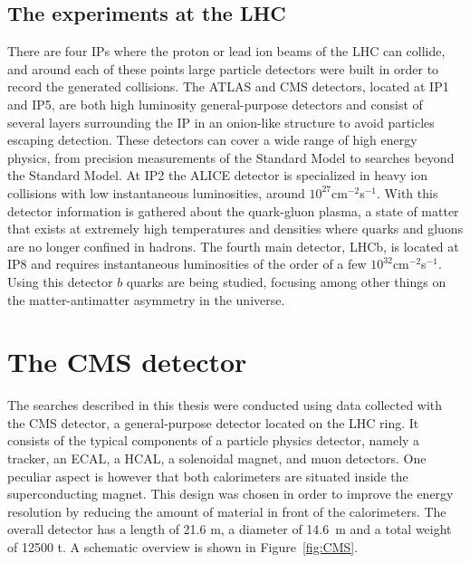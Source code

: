 \subsection{The experiments at the LHC}

There are four \acp{IP} where the proton or lead ion beams of the \ac{LHC} can collide, and around each of these points large particle detectors were built in order to record the generated collisions. The \acs{ATLAS} and \ac{CMS} detectors, located at \ac{IP}1 and \ac{IP}5, are both high luminosity general-purpose detectors and consist of several layers surrounding the \ac{IP} in an onion-like structure to avoid particles escaping detection. These detectors can cover a wide range of high energy physics, from precision measurements of the Standard Model to searches beyond the Standard Model. At \ac{IP}2 the \acs{ALICE} detector is specialized in heavy ion collisions with low instantaneous luminosities, around $10^{27}$cm$^{-2}$s$^{-1}$. With this detector information is gathered about the quark-gluon plasma, a state of matter that exists at extremely high temperatures and densities where quarks and gluons are no longer confined in hadrons. The fourth main detector, \acs{LHCb}, is located at \ac{IP}8 and requires instantaneous luminosities of the order of a few $10^{32}$cm$^{-2}$s$^{-1}$. Using this detector $b$ quarks are being studied, focusing among other things on the matter-antimatter asymmetry in the universe.

\section{The CMS detector} 
\label{sec:CMS}

The searches described in this thesis were conducted using data collected with the \ac{CMS} detector, a general-purpose detector located on the \ac{LHC} ring. It consists of the typical components of a particle physics detector, namely a tracker, an \ac{ECAL}, a \ac{HCAL}, a solenoidal magnet, and muon detectors. One peculiar aspect is however that both calorimeters are situated inside the superconducting magnet. This design was chosen in order to improve the energy resolution by reducing the amount of material in front of the calorimeters. The overall detector has a length of 21.6 m, a diameter of 14.6~m and a total weight of 12500 t. A schematic overview is shown in Figure~\ref{fig:CMS}.

